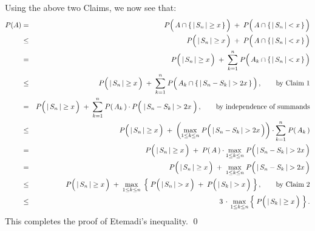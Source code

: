 \vskip 0.8cm
\noindent
Using the above two Claims, we now see that:
\begin{eqnarray*}
P(A)
&=&
	P\!\left(\,A\overset{{\color{white}.}}{\cap}\{\,\vert\,S_{n}\,\vert\geq x\,\}\,\right)
	\;+\; P\!\left(\,A\overset{{\color{white}.}}{\cap}\{\,\vert\,S_{n}\,\vert < x\,\}\,\right)
\\
&\leq&
	P\!\left(\,\vert\,S_{n}\,\vert \overset{{\color{white}.}}{\geq} x\,\right)
	\;+\; P\!\left(\,A\overset{{\color{white}:}}{\cap}\{\,\vert\,S_{n}\,\vert < x\,\}\,\right)
\\
&=&
	P\!\left(\,\vert\,S_{n}\,\vert \overset{{\color{white}.}}{\geq} x\,\right)
	\;+\; \overset{n}{\underset{k=1}{\sum}}\; P\!\left(\,A_{k}\overset{{\color{white}:}}{\cap}\{\,\vert\,S_{n}\,\vert < x\,\}\,\right)
\\
&\leq&
	P\!\left(\,\vert\,S_{n}\,\vert \overset{{\color{white}.}}{\geq} x\,\right)
	\;+\; \overset{n}{\underset{k=1}{\sum}}\; P\!\left(\,A_{k}\overset{{\color{white}:}}{\cap}\{\,\vert\,S_{n}-S_{k}\,\vert > 2x\,\}\,\right),
	\quad\quad\textnormal{by Claim 1}
\\
&=&
	P\!\left(\,\vert\,S_{n}\,\vert \overset{{\color{white}.}}{\geq} x\,\right)
	\;+\;
		\overset{n}{\underset{k=1}{\sum}}\;
		P\!\left(\,A_{k}\,\right)\cdot P\!\left(\;\vert\,S_{n}-S_{k}\,\vert \overset{{\color{white}.}}{>} 2x\;\right),
	\quad\quad\textnormal{by independence of summands}
\\
&\leq&
	P\!\left(\,\vert\,S_{n}\,\vert \overset{{\color{white}.}}{\geq} x\,\right)
	\;+\;
		\left(\underset{1\leq k \leq n}{\max}\;P\!\left(\,\vert\,S_{n}-S_{k}\,\vert \overset{{\color{white}.}}{>} 2x\,\right)\right)
		\cdot
		\overset{n}{\underset{k=1}{\sum}}\; P\!\left(\,A_{k}\,\right)
\\
&=&
	P\!\left(\,\vert\,S_{n}\,\vert \overset{{\color{white}.}}{\geq} x\,\right)
	\;+\;
		P\!\left(\,A\,\right) \cdot
		\underset{1\leq k \leq n}{\max}\;P\!\left(\,\vert\,S_{n}-S_{k}\,\vert \overset{{\color{white}.}}{>} 2x\,\right)
\\
&=&
	P\!\left(\,\vert\,S_{n}\,\vert \overset{{\color{white}.}}{\geq} x\,\right)
	\;+\; \underset{1\leq k \leq n}{\max}\;P\!\left(\,\vert\,S_{n}-S_{k}\,\vert \overset{{\color{white}.}}{>} 2x\,\right)
\\
&\leq&
	P\!\left(\,\vert\,S_{n}\,\vert \overset{{\color{white}.}}{\geq} x\,\right)
	\;+\;
	\underset{1\leq k \leq n}{\max}\;\left\{\;
		P\!\left(\,\vert\,S_{n}\,\vert \overset{{\color{white}.}}{>} x\,\right)
		\;+\;
		P\!\left(\,\vert\,S_{k}\,\vert \overset{{\color{white}.}}{>} x\,\right)
	\;\right\},
	\quad\quad\textnormal{by Claim 2}
\\
&\leq&
	3\,\cdot\,\underset{1\leq k \leq n}{\max}\left\{\;
		P\!\left(\,\vert\,S_{k}\,\vert \overset{{\color{white}.}}{\geq} x\,\right)
	\;\right\}.
\end{eqnarray*}
This completes the proof of Etemadi's inequality.
\qed

